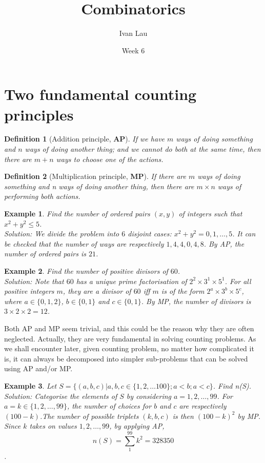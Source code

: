 \documentclass[11pt,a5paper]{article}
\title{\textbf{Combinatorics}}
\date{Week 6}
\author{Ivan Lau\\}
\newtheorem{definition}{Definition}
\newtheorem{example}{Example}
\begin{document}
\maketitle


\section{Two fundamental counting principles}

\begin{definition}[Addition principle, \textbf{AP}]
If we have $m$ ways of doing something and $n$ ways of doing another thing; and we cannot do both at the same time, then there are $m+n$ ways to choose one of the actions.
\end{definition}

\begin{definition}[Multiplication principle, \textbf{MP}]
If there are $m$ ways of doing something and n ways of doing another thing, then there are $m \times n$ ways of performing both actions.
\end{definition}

\begin{example} Find the number of ordered pairs $(x,y)$ of integers such that $x^2+y^2 \le 5$.\\
\textit{Solution}: We divide the problem into $6$ disjoint cases: $x^2+y^2 = 0,1,…,5$. It can be checked that the number of ways are respectively $1,4,4,0,4,8$. By AP, the number of ordered pairs is $21$.
\end{example}

\begin{example} Find the number of positive divisors of $60$. \\
\textit{Solution}: Note that $60$ has a unique prime factorisation of $2^2 \times 3^1 \times 5^1$. For all positive integers $m$, they are a divisor of $60$ iff $m$ is of the form $2^a \times 3^b \times 5^c$, where $a \in \{0,1,2\}$, $b \in \{0,1\}$ and $c \in \{0,1\}$. By MP, the number of divisors is $3 \times 2 \times 2 = 12$.
\end{example}

\noindent Both AP and MP seem trivial, and this could be the reason why they are often neglected. Actually, they are very fundamental in solving counting problems. As we shall encounter later, given counting problem, no matter how complicated it is, it can always be decomposed into simpler sub-problems that can be solved using AP and/or MP.

\begin{example} Let $S = \{(a,b,c) | a,b,c \in \{1,2,…100\}; a<b; a<c\}$.  Find n(S). \\
\textit{Solution}: Categorise the elements of $S$ by considering $a = 1,2,…,99$.  For $a = k \in \{1,2,…,99\}$, the number of choices for $b$ and $c$ are respectively $(100-k)$.The number of possible triplets $(k,b,c)$ is then $(100-k)^2$ by MP. Since $k$ takes on values $1,2,…,99$, by applying AP, \[n(S)= \sum_1^{99}{k^2} = 328350\].
\end{example}
\end{document}
